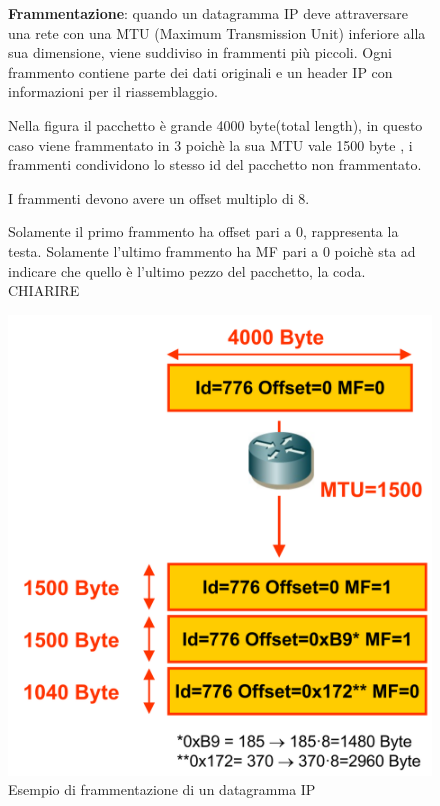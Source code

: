     \begin{figure}[h!]
        \begin{minipage}{0.55\textwidth}
            \textbf{Frammentazione}: quando un datagramma IP deve attraversare una rete con una MTU (Maximum Transmission Unit) inferiore alla sua dimensione, viene suddiviso in frammenti più piccoli. Ogni frammento contiene parte dei dati originali e un header IP con informazioni per il riassemblaggio.

            Nella figura il pacchetto è grande 4000 byte(total length), in questo caso viene frammentato in 3 poichè la sua MTU vale 1500 byte , i frammenti condividono lo stesso id del pacchetto non frammentato.

            I frammenti devono avere un offset multiplo di 8.

            Solamente il primo frammento ha offset pari a 0, rappresenta la testa.
            Solamente l'ultimo frammento ha MF pari a 0 poichè sta ad indicare che quello è l'ultimo pezzo del pacchetto, la coda. CHIARIRE
        \end{minipage}\hfill
        \begin{minipage}{0.4\textwidth}
            \centering
            \includegraphics[width=\textwidth]{images/frammentazione.png}
            \caption{Esempio di frammentazione di un datagramma IP}
            \label{fig:frammentazioneIP}
        \end{minipage}
    \end{figure}

